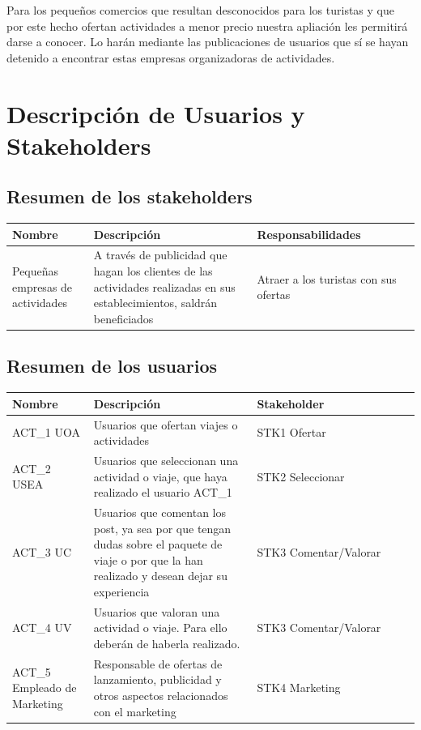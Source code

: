 \documentclass[11pt]{article}
\begin{document}
Para los pequeños comercios que resultan desconocidos para los turistas y que por este hecho ofertan actividades a menor precio nuestra apliación les permitirá darse a conocer. Lo harán mediante las publicaciones de usuarios que sí se hayan detenido a encontrar estas empresas organizadoras de actividades.
\newpage

\section{Descripción de Usuarios y Stakeholders}

\subsection{Resumen de los stakeholders}
\begin{table}[H]
  \centering
  \begin{tabular}{p{0.2\linewidth}p{0.4\linewidth}p{0.4\linewidth}}
    \toprule
    \textbf{Nombre} & \textbf{Descripción} & \textbf{Responsabilidades} \\
    \midrule
    Pequeñas empresas de actividades & A través de publicidad que hagan los clientes de las actividades realizadas en sus establecimientos, saldrán beneficiados & Atraer a los turistas con sus ofertas\\
    \bottomrule
  \end{tabular}
\end{table}

\subsection{Resumen de los usuarios}
\begin{table}[H]
  \centering
  \begin{tabular}{p{0.2\linewidth}p{0.4\linewidth}p{0.4\linewidth}}
    \toprule
    \textbf{Nombre} & \textbf{Descripción} & \textbf{Stakeholder} \\
    \midrule
    ACT\_1 UOA & Usuarios que ofertan viajes o actividades & STK1 Ofertar\\
    ACT\_2 USEA & Usuarios que seleccionan una actividad o viaje, que haya realizado el usuario ACT\_1 & STK2 Seleccionar\\
    ACT\_3 UC & Usuarios que comentan los post, ya sea por que tengan dudas sobre el paquete de viaje o por que la han realizado y desean dejar su experiencia & STK3 Comentar/Valorar\\
    ACT\_4 UV & Usuarios que valoran una actividad o viaje. Para ello deberán de haberla realizado. & STK3 Comentar/Valorar\\
    ACT\_5  Empleado de Marketing & Responsable de ofertas de lanzamiento, publicidad y otros aspectos relacionados con el marketing & STK4 Marketing\\
    \bottomrule
  \end{tabular}
\end{table}
\end{document}
